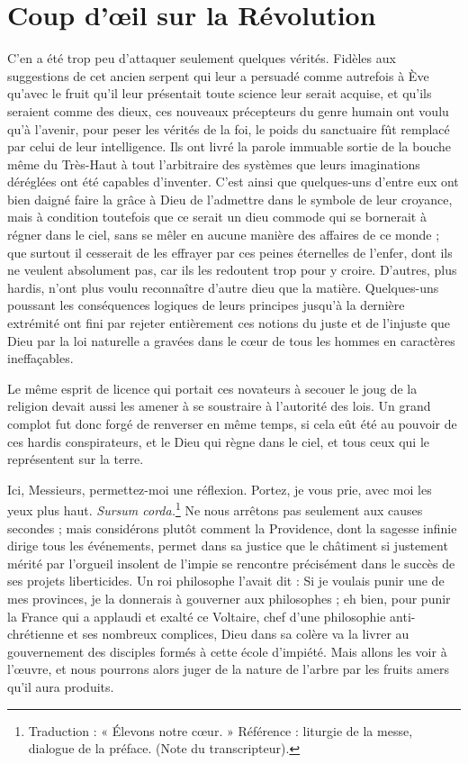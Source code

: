 \section*{Coup d'œil sur la Révolution}
C'en a été trop peu d'attaquer seulement quelques vérités. Fidèles aux suggestions de cet ancien serpent qui leur a persuadé comme autrefois à Ève qu'avec le fruit qu'il leur présentait toute science leur serait acquise,
et qu'ils seraient comme des dieux, ces nouveaux précepteurs du genre humain ont voulu qu'à l'avenir, pour peser les vérités de la foi, le poids du sanctuaire fût remplacé par celui de leur intelligence. Ils ont livré la parole immuable sortie de la bouche même du Très-Haut à tout l'arbitraire des systèmes que leurs imaginations déréglées ont été capables d'inventer. C'est ainsi que quelques-uns d'entre eux ont bien daigné faire la grâce à Dieu de l'admettre dans le symbole de leur croyance, mais à condition toutefois que ce serait un dieu commode qui se bornerait à régner dans le ciel, sans se mêler en aucune manière des affaires de ce monde ; que surtout il cesserait de les effrayer par ces peines éternelles de l'enfer, dont ils ne veulent absolument pas, car ils les redoutent trop pour y croire. D'autres, plus hardis, n'ont plus voulu reconnaître d'autre dieu que la matière. Quelques-uns poussant les conséquences logiques de leurs principes jusqu'à la dernière extrémité ont fini par rejeter entièrement ces notions du juste et de l'injuste que Dieu par la loi naturelle a gravées dans le cœur de tous les hommes en caractères ineffaçables.

Le même esprit de licence qui portait ces novateurs à secouer le joug de la religion devait aussi les amener à se soustraire à l'autorité des lois. Un grand complot fut donc forgé de renverser en même temps, si cela eût été au pouvoir de ces hardis conspirateurs, et le Dieu qui règne dans le ciel, et tous ceux qui le représentent sur la terre.

Ici, Messieurs, permettez-moi une réflexion. Portez, je vous prie, avec moi les yeux plus haut. \textit{Sursum corda.}\footnote{Traduction : « Élevons notre cœur. » Référence : liturgie de la messe, dialogue de la préface. (Note du transcripteur).} Ne nous
arrêtons pas seulement aux causes secondes ; mais considérons plutôt comment la Providence, dont la sagesse infinie dirige tous les événements, permet dans sa justice que le châtiment si justement mérité par l'orgueil insolent de l'impie se rencontre précisément dans le succès de ses projets liberticides. Un roi philosophe l'avait dit : Si je voulais punir une de mes provinces, je la donnerais à gouverner aux philosophes ; eh bien, pour punir la France qui a applaudi et exalté ce Voltaire, chef d'une philosophie anti-chrétienne et ses nombreux complices, Dieu dans sa colère va la livrer au gouvernement des disciples formés à cette école d'impiété. Mais allons les voir à l'œuvre, et nous pourrons alors juger de la nature de l'arbre par les fruits amers qu'il aura produits.

